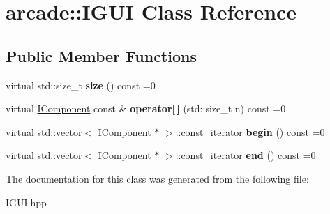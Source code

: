\hypertarget{classarcade_1_1IGUI}{}\section{arcade\+:\+:I\+G\+UI Class Reference}
\label{classarcade_1_1IGUI}
\subsection*{Public Member Functions}
\begin{DoxyCompactItemize}
\item 
\mbox{\label{classarcade_1_1IGUI_aee8a5c4e167a3b73696b139d637b7ca7}} 
virtual std\+::size\+\_\+t {\bfseries size} () const =0
\item 
\mbox{\label{classarcade_1_1IGUI_a429533730e71e2c76dceb5c368c13fae}} 
virtual \hyperlink{classarcade_1_1IComponent}{I\+Component} const  \& {\bfseries operator\mbox{[}$\,$\mbox{]}} (std\+::size\+\_\+t n) const =0
\item 
\mbox{\label{classarcade_1_1IGUI_a0d81a108dc38ec9157fff8d012806045}} 
virtual std\+::vector$<$ \hyperlink{classarcade_1_1IComponent}{I\+Component} $\ast$ $>$\+::const\+\_\+iterator {\bfseries begin} () const =0
\item 
\mbox{\label{classarcade_1_1IGUI_a07314d37b232ab0608773173dc2e80d5}} 
virtual std\+::vector$<$ \hyperlink{classarcade_1_1IComponent}{I\+Component} $\ast$ $>$\+::const\+\_\+iterator {\bfseries end} () const =0
\end{DoxyCompactItemize}


The documentation for this class was generated from the following file\+:\begin{DoxyCompactItemize}
\item 
I\+G\+U\+I.\+hpp\end{DoxyCompactItemize}
